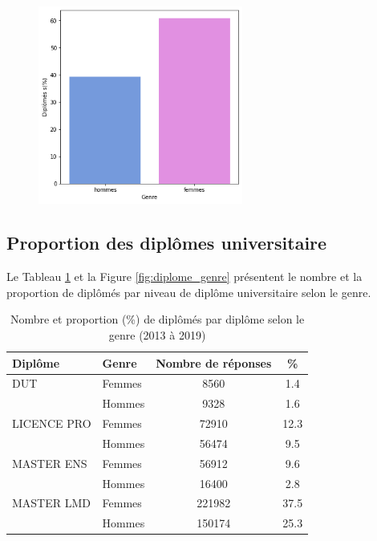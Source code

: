 \documentclass[12pt, a4paper, titlepage, table]{article}
\begin{document}
		\begin{figure}[H]
			\centering
			\includegraphics[width=0.6\textwidth]{../graphs/proportion_genre.png}
			\label{fig:genre_reponses}
		\end{figure}
	
	\subsection{Proportion des diplômes universitaire}
	Le Tableau \ref{tab:diplome_genre} et la Figure \ref{fig:diplome_genre} présentent le nombre et la proportion de diplômés par niveau de diplôme universitaire selon le genre. 
	
		\begin{table}[H]
			\centering
			\begin{tabular}{llcc}
				\toprule
				\textbf{Diplôme} & \textbf{Genre} & \textbf{Nombre de réponses} & \textbf{\%} \\
				\midrule
				DUT & Femmes & 8560 & 1.4 \\
				& Hommes & 9328 & 1.6 \\
				\midrule
				LICENCE PRO & Femmes & 72910 & 12.3 \\
				& Hommes & 56474 & 9.5 \\
				\midrule
				MASTER ENS & Femmes & 56912 & 9.6 \\
				& Hommes & 16400 & 2.8 \\
				\midrule
				MASTER LMD & Femmes & 221982 & 37.5 \\
				& Hommes & 150174 & 25.3 \\
				\bottomrule
			\end{tabular}
			\caption{Nombre et proportion (\%) de diplômés par diplôme selon le genre (2013 à 2019)}
			\label{tab:diplome_genre}
		\end{table}
		
\end{document}
